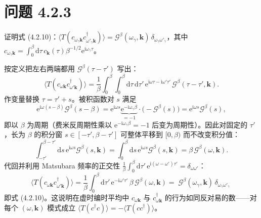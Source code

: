 \section*{问题 4.2.3}
\begin{problem}
证明式 (4.2.10)：$\langle T(c_{\omega_\gamma\pmb{k}}c^\dagger_{\omega'_\gamma\pmb{k}})\rangle=\mathcal{G}^\beta(\omega_\gamma,\pmb{k})\,\delta_{\omega_\gamma\omega'_\gamma}$，其中 $c_{\omega_\gamma\pmb{k}}=\int_0^\beta\mathrm{d}\tau\,c_{\pmb{k}}(\tau)\beta^{-1/2}\mathrm{e}^{\mathrm{i}\omega_\gamma\tau}$。
\end{problem}
\solution
按定义把左右两端都用 $\mathcal{G}^\beta(\tau-\tau')$ 写出：
\begin{equation*}
\big\langle T(c_{\omega\pmb{k}}c^\dagger_{\omega'\pmb{k}})\big\rangle
=\frac{1}{\beta}\int_0^\beta\!\!\int_0^\beta\mathrm{d}\tau\,\mathrm{d}\tau'\,
\mathrm{e}^{\mathrm{i}\omega\tau-\mathrm{i}\omega'\tau'}\,\mathcal{G}^\beta(\tau-\tau',\pmb{k}).
\end{equation*}
作变量替换 $\tau=\tau'+s$。被积函数对 $s$ 满足
\begin{equation*}
\mathrm{e}^{\mathrm{i}\omega(s-\beta)}\mathcal{G}^\beta(s-\beta)
=\mathrm{e}^{\mathrm{i}\omega s}\underbrace{\mathrm{e}^{-\mathrm{i}\omega_\gamma\beta}}_{=-1}\cdot\big(-\mathcal{G}^\beta(s)\big)
=\mathrm{e}^{\mathrm{i}\omega s}\mathcal{G}^\beta(s),
\end{equation*}
即以 $\beta$ 为周期（费米反周期性乘以 $\mathrm{e}^{-\mathrm{i}\omega_\gamma\beta}=-1$ 后变为周期性）。因此对固定的 $\tau'$，长为 $\beta$ 的积分窗 $s\in[-\tau',\beta-\tau']$ 可整体平移到 $[0,\beta)$ 而不改变积分值：
\begin{equation*}
\int_{-\tau'}^{\beta-\tau'}\mathrm{d}s\,\mathrm{e}^{\mathrm{i}\omega s}\mathcal{G}^\beta(s,\pmb{k})
=\int_0^\beta\mathrm{d}s\,\mathrm{e}^{\mathrm{i}\omega s}\mathcal{G}^\beta(s,\pmb{k})
=\beta\,\mathcal{G}^\beta(\omega,\pmb{k}).
\end{equation*}
代回并利用 Matsubara 频率的正交性 $\frac{1}{\beta}\int_0^\beta\mathrm{d}\tau'\,\mathrm{e}^{\mathrm{i}(\omega-\omega')\tau'}=\delta_{\omega\omega'}$：
\begin{equation*}
\big\langle T(c_{\omega\pmb{k}}c^\dagger_{\omega'\pmb{k}})\big\rangle
=\frac{1}{\beta}\int_0^\beta\mathrm{d}\tau'\,\mathrm{e}^{-\mathrm{i}\omega'\tau'}\,\beta\,\mathcal{G}^\beta(\omega,\pmb{k})
=\boxed{\;\mathcal{G}^\beta(\omega_\gamma,\pmb{k})\,\delta_{\omega_\gamma\omega'_\gamma}\;}
\end{equation*}
即式 (4.2.10)。这说明在虚时编时平均中 $c_{\omega\pmb{k}}$ 与 $c^\dagger_{\omega\pmb{k}}$ 的行为如同反对易的数——对每个 $(\omega,\pmb{k})$ 模式成立 $\langle T(c^\dagger c)\rangle=-\langle T(cc^\dagger)\rangle$。


